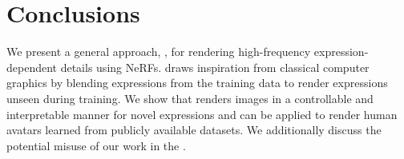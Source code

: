 \section{Conclusions}
  \label{sec:blendfields-conclusion}
  We present a general approach, \blendfields, for rendering high-frequency
  expression-dependent details using NeRFs.
  \blendfields draws inspiration from classical computer graphics by blending expressions from the training data to render expressions unseen during training.
  We show that \blendfields renders images in a controllable and interpretable
  manner for novel expressions and can be applied to render human avatars
  learned from publicly available datasets.
  We additionally discuss the potential misuse of our work in the
  \supplementary{}.


